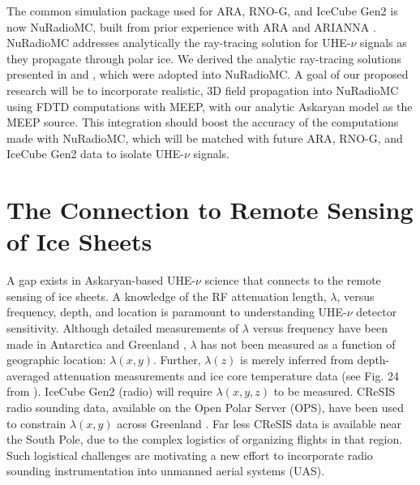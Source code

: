 \documentclass[11pt]{amsart}
\begin{document}
The common simulation package used for ARA, RNO-G, and IceCube Gen2 is now NuRadioMC, built from prior experience with ARA and ARIANNA \cite{10.1140/epjc/s10052-020-7612-8,10.1109/tns.2015.2468182,10.1016/j.astropartphys.2011.11.010,10.1016/j.astropartphys.2015.04.002,10.1103/physrevd.102.043021}.  NuRadioMC addresses analytically the ray-tracing solution for UHE-$\nu$ signals as they propagate through polar ice.  We derived the analytic ray-tracing solutions presented in \cite{10.1140/epjc/s10052-020-7612-8} and \cite{horizPaper}, which were adopted into NuRadioMC.  A goal of our proposed research will be to incorporate realistic, 3D field propagation into NuRadioMC using FDTD computations with MEEP, with our analytic Askaryan model as the MEEP source.  This integration should boost the accuracy of the computations made with NuRadioMC, which will be matched with future ARA, RNO-G, and IceCube Gen2 data to isolate UHE-$\nu$ signals.

\section{The Connection to Remote Sensing of Ice Sheets}
\label{sec:cresis}

A gap exists in Askaryan-based UHE-$\nu$ science that connects to the remote sensing of ice sheets.  A knowledge of the RF attenuation length, $\lambda$, versus frequency, depth, and location is paramount to understanding UHE-$\nu$ detector sensitivity.  Although detailed measurements of $\lambda$ versus frequency have been made in Antarctica and Greenland \cite{aguilar_2022,10.3189/2015jog14j214,10.3189/2015jog15j057,barwick_besson_gorham_saltzberg_2005}, $\lambda$ has not been measured as a function of geographic location: $\lambda(x,y)$.  Further, $\lambda(z)$ is merely inferred from depth-averaged attenuation measurements and ice core temperature data (see Fig. 24 from \cite{10.1016/j.astropartphys.2011.11.010}). IceCube Gen2 (radio) will require $\lambda(x,y,z)$ to be measured.  CReSIS radio sounding data, available on the Open Polar Server (OPS), have been used to constrain $\lambda(x,y)$ across Greenland \cite{10.1002/2015rs005849}.  Far less CReSIS data is available near the South Pole, due to the complex logistics of organizing flights in that region.  Such logistical challenges are motivating a new effort to incorporate radio sounding instrumentation into unmanned aerial systems (UAS). 
\end{document}
